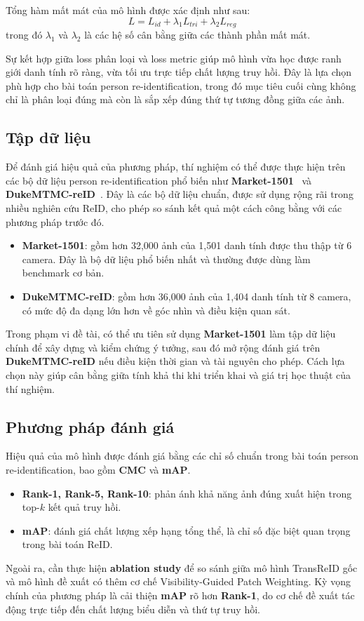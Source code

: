 Tổng hàm mất mát của mô hình được xác định như sau:
\[
L = L_{id} + \lambda_1 L_{tri} + \lambda_2 L_{reg}
\]
trong đó \(\lambda_1\) và \(\lambda_2\) là các hệ số cân bằng giữa các thành phần mất mát.

Sự kết hợp giữa loss phân loại và loss metric giúp mô hình vừa học được ranh giới danh tính rõ ràng, vừa tối ưu trực tiếp chất lượng truy hồi. Đây là lựa chọn phù hợp cho bài toán person re-identification, trong đó mục tiêu cuối cùng không chỉ là phân loại đúng mà còn là sắp xếp đúng thứ tự tương đồng giữa các ảnh.

\subsection{Tập dữ liệu}
Để đánh giá hiệu quả của phương pháp, thí nghiệm có thể được thực hiện trên các bộ dữ liệu person re-identification phổ biến như \textbf{Market-1501}~\cite{zheng2015market1501} và \textbf{DukeMTMC-reID}~\cite{gou2017dukemtmc4reid}. Đây là các bộ dữ liệu chuẩn, được sử dụng rộng rãi trong nhiều nghiên cứu ReID, cho phép so sánh kết quả một cách công bằng với các phương pháp trước đó.

\begin{itemize}
    \item \textbf{Market-1501}: gồm hơn 32,000 ảnh của 1,501 danh tính được thu thập từ 6 camera. Đây là bộ dữ liệu phổ biến nhất và thường được dùng làm benchmark cơ bản.
    \item \textbf{DukeMTMC-reID}: gồm hơn 36,000 ảnh của 1,404 danh tính từ 8 camera, có mức độ đa dạng lớn hơn về góc nhìn và điều kiện quan sát.
\end{itemize}

Trong phạm vi đề tài, có thể ưu tiên sử dụng \textbf{Market-1501} làm tập dữ liệu chính để xây dựng và kiểm chứng ý tưởng, sau đó mở rộng đánh giá trên \textbf{DukeMTMC-reID} nếu điều kiện thời gian và tài nguyên cho phép. Cách lựa chọn này giúp cân bằng giữa tính khả thi khi triển khai và giá trị học thuật của thí nghiệm.

\subsection{Phương pháp đánh giá}

Hiệu quả của mô hình được đánh giá bằng các chỉ số chuẩn trong bài toán person re-identification, bao gồm \textbf{CMC} và \textbf{mAP}.

\begin{itemize}
    \item \textbf{Rank-1, Rank-5, Rank-10}: phản ánh khả năng ảnh đúng xuất hiện trong top-\(k\) kết quả truy hồi.
    \item \textbf{mAP}: đánh giá chất lượng xếp hạng tổng thể, là chỉ số đặc biệt quan trọng trong bài toán ReID.
\end{itemize}

Ngoài ra, cần thực hiện \textbf{ablation study} để so sánh giữa mô hình TransReID gốc và mô hình đề xuất có thêm cơ chế Visibility-Guided Patch Weighting. Kỳ vọng chính của phương pháp là cải thiện \textbf{mAP} rõ hơn \textbf{Rank-1}, do cơ chế đề xuất tác động trực tiếp đến chất lượng biểu diễn và thứ tự truy hồi.
